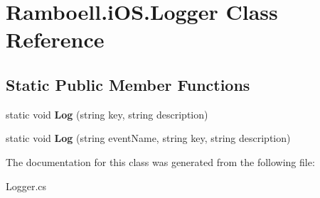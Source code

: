 \hypertarget{class_ramboell_1_1i_o_s_1_1_logger}{}\section{Ramboell.\+i\+O\+S.\+Logger Class Reference}
\label{class_ramboell_1_1i_o_s_1_1_logger}
\subsection*{Static Public Member Functions}
\begin{DoxyCompactItemize}
\item 
\mbox{\label{class_ramboell_1_1i_o_s_1_1_logger_a8e50b94799794db86f2b88ffbfa060cf}} 
static void {\bfseries Log} (string key, string description)
\item 
\mbox{\label{class_ramboell_1_1i_o_s_1_1_logger_a1c07216d9ee25c80a79be09c9387b48b}} 
static void {\bfseries Log} (string event\+Name, string key, string description)
\end{DoxyCompactItemize}


The documentation for this class was generated from the following file\+:\begin{DoxyCompactItemize}
\item 
Logger.\+cs\end{DoxyCompactItemize}
